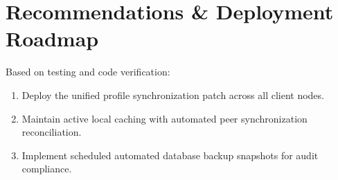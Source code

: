 \documentclass[11pt,a4paper]{article}
\begin{document}
\section{Recommendations & Deployment Roadmap}
Based on testing and code verification:
\begin{enumerate}
    \item Deploy the unified profile synchronization patch across all client nodes.
    \item Maintain active local caching with automated peer synchronization reconciliation.
    \item Implement scheduled automated database backup snapshots for audit compliance.
\end{enumerate}
\end{document}
